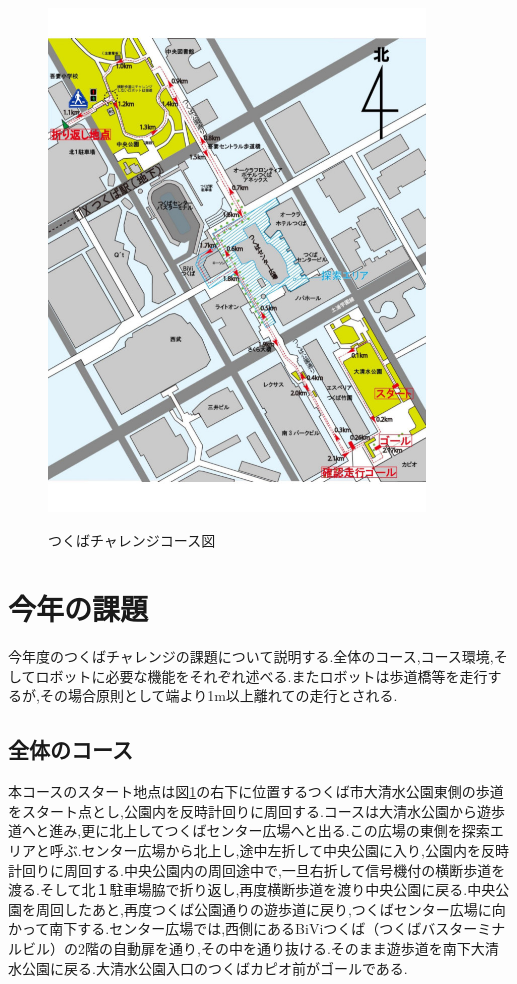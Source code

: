 \documentclass[12pt,oneside]{sotsuken_paper}
\begin{document}
\begin{figure}[htp] 
 \begin{center} 
  \includegraphics[width=100mm]{img/hard/tizu.jpg} 
 　\caption{つくばチャレンジコース図} 
  \label{fig:tizu}%
 \end{center} 
\end{figure} 

\section{今年の課題} 
今年度のつくばチャレンジの課題について説明する.全体のコース,コース環境,そしてロボットに必要な機能をそれぞれ述べる.またロボットは歩道橋等を走行するが,その場合原則として端より1m以上離れての走行とされる. 
\subsection{全体のコース} 
本コースのスタート地点は図\ref{fig:tizu}の右下に位置するつくば市大清水公園東側の歩道をスタート点とし,公園内を反時計回りに周回する.コースは大清水公園から遊歩道へと進み,更に北上してつくばセンター広場へと出る.この広場の東側を探索エリアと呼ぶ.センター広場から北上し,途中左折して中央公園に入り,公園内を反時計回りに周回する.中央公園内の周回途中で,一旦右折して信号機付の横断歩道を渡る.そして北１駐車場脇で折り返し,再度横断歩道を渡り中央公園に戻る.中央公園を周回したあと,再度つくば公園通りの遊歩道に戻り,つくばセンター広場に向かって南下する.センター広場では,西側にあるBiViつくば（つくばバスターミナルビル）の2階の自動扉を通り,その中を通り抜ける.そのまま遊歩道を南下大清水公園に戻る.大清水公園入口のつくばカピオ前がゴールである. 
\end{document}
